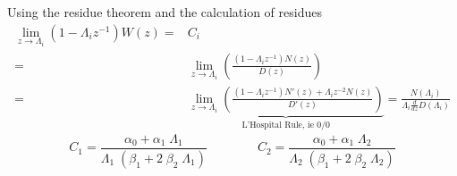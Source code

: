 \documentclass[10pt]{amsart}
\begin{document}
Using the residue theorem and the calculation of residues
\[
\begin{split}
\lim_{z \rightarrow \Lambda_i } 
\left(
1 -\Lambda_i z^{-1}
\right)
W(z)
 =& 
C_i
\\
  = &
\lim_{z \rightarrow \Lambda_i } 
\left(
\frac{
\left( 1 -\Lambda_i z^{-1} \right) N(z )
}{D(z)}
\right)
\\
 = & 
  \underbrace{
\lim_{z \rightarrow \Lambda_i } 
\left(
\frac{
\left( 1 -\Lambda_i z^{-1} \right)N'(z )  + \Lambda_i z^{-2}N(z )
}{D'(z)}
\right)
}_\text{L'Hospital Rule, ie 0/0} 
=
\frac{N(\Lambda_i )}{\Lambda_i \frac{d}{dz}D(\Lambda_i)}
\end{split}
\]
\begin{equation} \label{ComplexAmplitudes}
  C_1 = \frac{\alpha_0+\alpha_1 \;\Lambda_1}{\Lambda_1 \; (\beta_1+ 2\; \beta_2 \; \Lambda_1)}
 \qquad \qquad
  C_2 = \frac{\alpha_0+\alpha_1 \;\Lambda_2}{\Lambda_2 \; (\beta_1+ 2\; \beta_2 \; \Lambda_2)}
\end{equation}
\pagebreak
\end{document}
